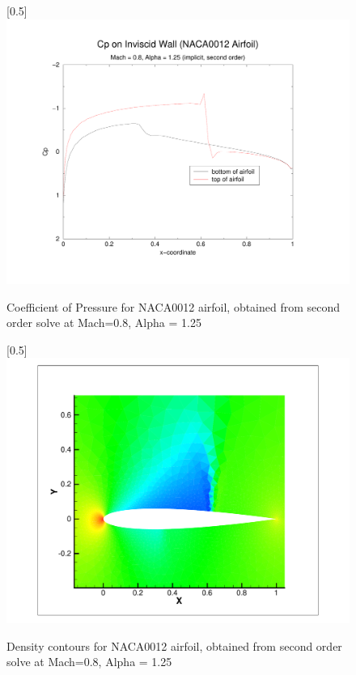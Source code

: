 \documentclass[letterpaper,twoside,11pt,openright,pdf]{book} %
\begin{document}
\begin{center}
\begin{figure}[h]
\centering
\scalebox{0.5}[0.5]{\includegraphics{Cp2.pdf}}
\caption{Coefficient of Pressure for NACA0012 airfoil, obtained from second order solve at Mach=0.8, Alpha = 1.25}
\label{fig:CP}
\end{figure}
\end{center}

\begin{center}
\begin{figure}[h]
\centering
\scalebox{0.5}[0.5]{\includegraphics{rho.pdf}}
\caption{Density contours for NACA0012 airfoil, obtained from second order solve at Mach=0.8, Alpha = 1.25}
\label{fig:RHO}
\end{figure}
\end{center}
\end{document}
